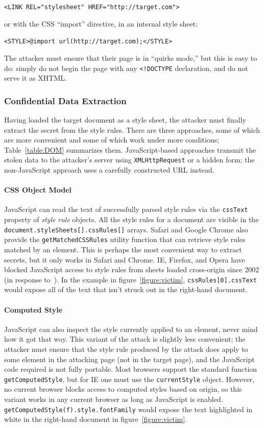 \documentclass{acm_proc_article-sp}
\begin{document}
\verb|<LINK REL="stylesheet" HREF="http://target.com">|

or with the CSS “import” directive, in an internal style sheet:

\verb|<STYLE>@import url(http://target.com);</STYLE>|

The attacker must ensure that their page is in “quirks mode,” but this
is easy to do: simply do not begin the page with any \verb|<!DOCTYPE|
declaration, and do not serve it as XHTML.

\subsubsection{Confidential Data Extraction}\label{sec:extraction}
Having loaded the target document as a style sheet, the attacker must
finally extract the secret from the style rules.  There are three
approaches, some of which are more convenient and some of which work
under more conditions; Table~\ref{table:DOM} summarizes them.
JavaScript-based approaches transmit the stolen data to the attacker's
server using \texttt{XMLHttpRequest} or a hidden form; the
non-JavaScript approach uses a carefully constructed URL instead.

\paragraph{CSS Object Model}
JavaScript can read the text of successfully parsed style rules via
the \texttt{cssText} property of \emph{style rule} objects.  All the
style rules for a document are visible in the
\texttt{document.styleSheets[].cssRules[]} arrays.  Safari and Google
Chrome also provide the \texttt{getMatchedCSSRules} utility function
that can retrieve style rules matched by an element.  This is perhaps
the most convenient way to extract secrets, but it only works in
Safari and Chrome.  IE, Firefox, and Opera have blocked JavaScript
access to style rules from sheets loaded cross-origin since 2002 (in
response to~\cite{cssxss02}).  In the example in
figure~\ref{figure:victim}, \texttt{cssRules[0].cssText} would expose
all of the text that isn't struck out in the right-hand document.

\paragraph{Computed Style}
JavaScript can also inspect the style currently applied to an element,
never mind how it got that way.  This variant of the attack is
slightly less convenient; the attacker must ensure that the style rule
produced by the attack does apply to some element in the attacking
page (not in the target page), and the JavaScript code required is not
fully portable.  Most browsers support the standard function
\texttt{getComputedStyle}, but for IE one must use the
\texttt{currentStyle} object.  However, no current browser blocks
access to computed styles based on origin, so this variant works in
any current browser as long as JavaScript is enabled.
\texttt{getComputedStyle(f).style.fontFamily} would expose the text
highlighted in white in the right-hand document in
figure~\ref{figure:victim}.
\end{document}
